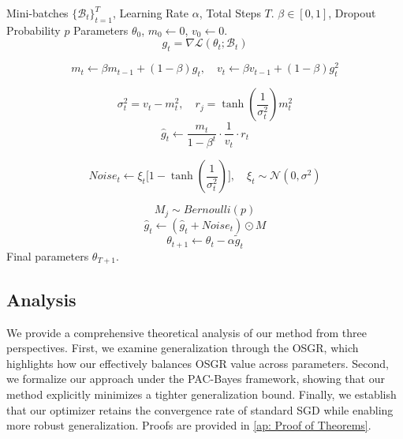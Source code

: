 \documentclass{article}
\theoremstyle{plain}
\theoremstyle{definition}
\theoremstyle{remark}
\begin{document}
\begin{algorithm}[ht]
    \caption{Algorithm for GENIE}
    \label{alg:GENIE}
\begin{algorithmic}
 Mini-batches $\{\mathcal{B}_t\}_{t=1}^T$, Learning Rate $\alpha$, Total Steps $T$.
 $\beta \in [0,1]$, Dropout Probability $p$
 Parameters $\theta_0$, $m_0 \gets 0$, $v_0 \gets 0$.
     \[
    g_t = \nabla \mathcal{L}(\theta_t; \mathcal{B}_t)
    \]
    
     \[
    m_t \gets \beta m_{t-1} + (1-\beta) g_t, \quad 
    v_t \gets \beta v_{t-1} + (1-\beta) g_t^2
    \]
    
    \[
    \sigma_t^2= v_t - m_t^2, \quad 
    r_j = \tanh(\frac{1}{\sigma_t^2})m_t^2
    \]
    \[\hat{g}_t \gets \frac{m_t}{1-\beta^t} \cdot \frac{1}{v_t} \cdot r_t
    \]
    
    \[
    Noise_t \gets \xi_t \bigl[1 - \tanh(\frac{1}{\sigma_t^2})\bigr], \quad 
    \xi_t \sim \mathcal{N}(0, \sigma^2)
    \]
    
    \[ 
    M_j \sim Bernoulli(p)
    \]
    \[
    \hat{g}_t \gets (\hat{g}_t + Noise_t) \odot M
    \]
    \[
    \theta_{t+1} \gets \theta_t - \alpha \tilde{g}_t
    \]
\ENDFOR
{} Final parameters $\theta_{T+1}$.
\end{algorithmic}
\end{algorithm}

\subsection{Analysis}
We provide a comprehensive theoretical analysis of our method from three perspectives. First, we examine generalization through the OSGR, which highlights how our effectively balances OSGR value across parameters. Second, we formalize our approach under the PAC-Bayes framework, showing that our method explicitly minimizes a tighter generalization bound. Finally, we establish that our optimizer retains the convergence rate of standard SGD while enabling more robust generalization. Proofs are provided in \cref{ap: Proof of Theorems}.
\end{document}
